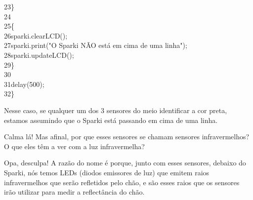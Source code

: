 \documentclass[conference]{IEEEtran}
\begin{document}
{{\color{gray}23}\quad\quad \}\\
{\color{gray}24}\quad{}\\
{\color{gray}25}\quad\quad \{\\
{\color{gray}26}\quad\quad\quad sparki.clearLCD();\\
{\color{gray}27}\quad\quad\quad sparki.print("O Sparki NÃO está em cima de uma linha");\\
{\color{gray}28}\quad\quad\quad sparki.updateLCD();\\
{\color{gray}29}\quad\quad \}\\
{\color{gray}30}\\
{\color{gray}31}\quad\quad delay(500);\\
{\color{gray}32}\quad\}}\\
\par
Nesse caso, se qualquer um dos 3 sensores do meio identificar a cor preta, estamos assumindo que o Sparki está passando em cima de uma linha.
\par
Calma lá! Mas afinal, por que esses sensores se chamam sensores infravermelhos? O que eles têm a ver com a luz infravermelha?
\par
Opa, desculpa! A razão do nome é porque, junto com esses sensores, debaixo do Sparki, nós temos LEDs (diodos emissores de luz) que emitem raios infravermelhos que serão refletidos pelo chão, e são esses raios que os sensores irão utilizar para medir a reflectância do chão.
\end{document}

